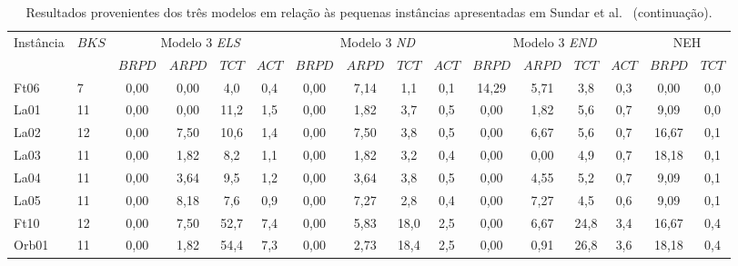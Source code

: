 \begin{landscape}
\begin{table}[H]
\ContinuedFloat
\caption{Resultados provenientes dos três modelos em relação às pequenas instâncias apresentadas em Sundar et al.~\cite{sundarHybridArtificialBee2017} (continuação).}
\label{tab:P2_instan}
\setlength{\tabcolsep}{3pt} %
\begin{tabular}{ll|cccc|cccc|cccc|cc}
\multirow{2}{*}{Instância} & \multirow{2}{*}{$BKS$} & \multicolumn{4}{c|}{Modelo 3 \textit{ELS}} & \multicolumn{4}{c|}{Modelo 3 \textit{ND}} & \multicolumn{4}{c|}{Modelo 3 \textit{END}} & \multicolumn{2}{c}{NEH} \\
                           &                        & $BRPD$  & $ARPD$  & $TCT$  & $ACT$  & $BRPD$  & $ARPD$ & $TCT$ & $ACT$ & $BRPD$  & $ARPD$ & $TCT$ & $ACT$ & $BRPD$      & $TCT$     \\ \hline
Ft06                       & 7                      & 0,00    & 0,00    & 4,0    & 0,4    & 0,00    & 7,14   & 1,1   & 0,1   & 14,29   & 5,71   & 3,8   & 0,3   & 0,00        & 0,0       \\
La01                       & 11                     & 0,00    & 0,00    & 11,2   & 1,5    & 0,00    & 1,82   & 3,7   & 0,5   & 0,00    & 1,82   & 5,6   & 0,7   & 9,09        & 0,0       \\
La02                       & 12                     & 0,00    & 7,50    & 10,6   & 1,4    & 0,00    & 7,50   & 3,8   & 0,5   & 0,00    & 6,67   & 5,6   & 0,7   & 16,67       & 0,1       \\
La03                       & 11                     & 0,00    & 1,82    & 8,2    & 1,1    & 0,00    & 1,82   & 3,2   & 0,4   & 0,00    & 0,00   & 4,9   & 0,7   & 18,18       & 0,1       \\
La04                       & 11                     & 0,00    & 3,64    & 9,5    & 1,2    & 0,00    & 3,64   & 3,8   & 0,5   & 0,00    & 4,55   & 5,2   & 0,7   & 9,09        & 0,1       \\
La05                       & 11                     & 0,00    & 8,18    & 7,6    & 0,9    & 0,00    & 7,27   & 2,8   & 0,4   & 0,00    & 7,27   & 4,5   & 0,6   & 9,09        & 0,1       \\
Ft10                       & 12                     & 0,00    & 7,50    & 52,7   & 7,4    & 0,00    & 5,83   & 18,0  & 2,5   & 0,00    & 6,67   & 24,8  & 3,4   & 16,67       & 0,4       \\
Orb01                      & 11                     & 0,00    & 1,82    & 54,4   & 7,3    & 0,00    & 2,73   & 18,4  & 2,5   & 0,00    & 0,91   & 26,8  & 3,6   & 18,18       & 0,4       \\

\end{tabular}
\end{table}
\end{landscape}
